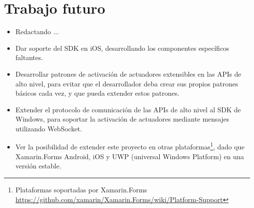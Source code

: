 \section{Trabajo futuro}

\begin{itemize}
	\item Redactando ...
	\item Dar soporte del SDK en iOS, desarrollando los componentes específicos faltantes.
	\item Desarrollar patrones de activación de actuadores extensibles en las APIs de alto nivel, para evitar que el desarrollador deba crear sus propios patrones básicos cada vez, y que pueda extender estos patrones.
	\item Extender el protocolo de comunicación de las APIs de alto nivel al SDK de Windows, para soportar la activación de actuadores mediante mensajes utilizando WebSocket.
	\item Ver la posibilidad de extender este proyecto en otras plataformas\footnote{Plataformas soportadas por Xamarin.Forms \url{https://github.com/xamarin/Xamarin.Forms/wiki/Platform-Support}}, dado que Xamarin.Forms Android, iOS y UWP (universal Windows Platform) en una versión estable.
\end{itemize}